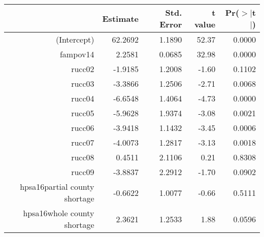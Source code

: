 \begin{table}[ht]
\centering
\begin{tabular}{rrrrr}
  \hline
 & Estimate & Std. Error & t value & Pr($>$$|$t$|$) \\ 
  \hline
(Intercept) & 62.2692 & 1.1890 & 52.37 & 0.0000 \\ 
  fampov14 & 2.2581 & 0.0685 & 32.98 & 0.0000 \\ 
  rucc02 & -1.9185 & 1.2008 & -1.60 & 0.1102 \\ 
  rucc03 & -3.3866 & 1.2506 & -2.71 & 0.0068 \\ 
  rucc04 & -6.6548 & 1.4064 & -4.73 & 0.0000 \\ 
  rucc05 & -5.9628 & 1.9374 & -3.08 & 0.0021 \\ 
  rucc06 & -3.9418 & 1.1432 & -3.45 & 0.0006 \\ 
  rucc07 & -4.0073 & 1.2817 & -3.13 & 0.0018 \\ 
  rucc08 & 0.4511 & 2.1106 & 0.21 & 0.8308 \\ 
  rucc09 & -3.8837 & 2.2912 & -1.70 & 0.0902 \\ 
  hpsa16partial county shortage & -0.6622 & 1.0077 & -0.66 & 0.5111 \\ 
  hpsa16whole county shortage & 2.3621 & 1.2533 & 1.88 & 0.0596 \\ 
   \hline
\end{tabular}
\end{table}
